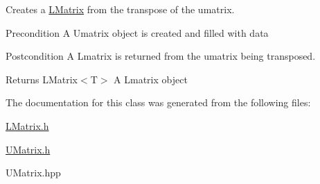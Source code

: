 Creates a \mbox{\hyperlink{class_l_matrix}{L\+Matrix}} from the transpose of the umatrix. 

\begin{DoxyPrecond}{Precondition}
A Umatrix object is created and filled with data 
\end{DoxyPrecond}
\begin{DoxyPostcond}{Postcondition}
A Lmatrix is returned from the umatrix being transposed.
\end{DoxyPostcond}
\begin{DoxyReturn}{Returns}
L\+Matrix$<$\+T$>$ A Lmatrix object 
\end{DoxyReturn}


The documentation for this class was generated from the following files\+:\begin{DoxyCompactItemize}
\item 
\mbox{\hyperlink{_l_matrix_8h}{L\+Matrix.\+h}}\item 
\mbox{\hyperlink{_u_matrix_8h}{U\+Matrix.\+h}}\item 
U\+Matrix.\+hpp\end{DoxyCompactItemize}
